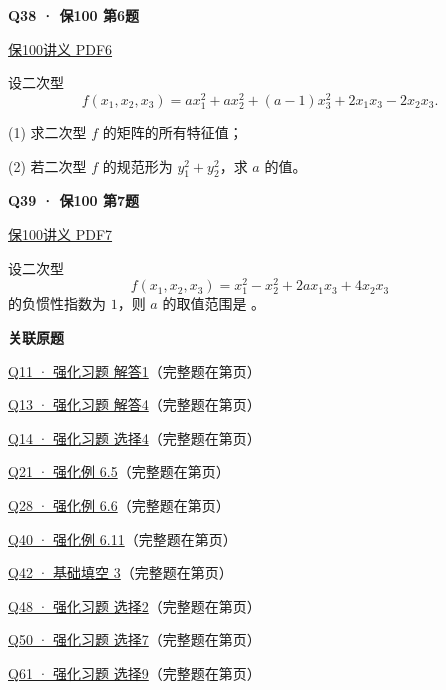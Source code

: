 \documentclass[UTF8,fontset=fandol,11pt,a4paper]{ctexart}
\newcommand{\source}[1]{{\footnotesize\color{Muted}#1\par}}
\newcommand{\qtitle}[2]{\par\needspace{5\baselineskip}\hypertarget{#1}{}\label{#1}\textbf{#2}\par}
\begin{document}
\begin{minipage}{\linewidth}
\qtitle{S-06}{Q38 · 保100 第6题}
\source{\href{file:///Users/skyintelligence/Desktop/\%E5\%BE\%97\%E8\%AF\%BB\%E4\%B8\%AA\%E7\%A0\%94-\%E5\%8C\%97\%E5\%A4\%A7\%E8\%BD\%AF\%E5\%BE\%AE/\%E6\%95\%B0\%E5\%AD\%A6\%20150/02\_\%E4\%B8\%93\%E9\%A1\%B9\%E5\%88\%B7\%E9\%A2\%98\_\%E4\%BF\%9D100/\%E7\%BA\%BF\%E6\%80\%A7\%E4\%BB\%A3\%E6\%95\%B0/\%E7\%BA\%BF\%E6\%80\%A7\%E4\%BB\%A3\%E6\%95\%B0\%E4\%B8\%93\%E9\%A1\%B9\%E5\%88\%B7\%E9\%A2\%98\%E8\%AF\%BE14-\%E4\%BA\%8C\%E6\%AC\%A1\%E5\%9E\%8B\%20\%E8\%AE\%B2\%E4\%B9\%89.pdf\#page=6}{保100讲义 PDF6}}
设二次型\[f(x_1,x_2,x_3)=ax_1^2+ax_2^2+(a-1)x_3^2+2x_1x_3-2x_2x_3.\]\par (1) 求二次型 \(f\) 的矩阵的所有特征值；\par (2) 若二次型 \(f\) 的规范形为 \(y_1^2+y_2^2\)，求 \(a\) 的值。
\end{minipage}\par\vspace{7mm}
\begin{minipage}{\linewidth}
\qtitle{S-07}{Q39 · 保100 第7题}
\source{\href{file:///Users/skyintelligence/Desktop/\%E5\%BE\%97\%E8\%AF\%BB\%E4\%B8\%AA\%E7\%A0\%94-\%E5\%8C\%97\%E5\%A4\%A7\%E8\%BD\%AF\%E5\%BE\%AE/\%E6\%95\%B0\%E5\%AD\%A6\%20150/02\_\%E4\%B8\%93\%E9\%A1\%B9\%E5\%88\%B7\%E9\%A2\%98\_\%E4\%BF\%9D100/\%E7\%BA\%BF\%E6\%80\%A7\%E4\%BB\%A3\%E6\%95\%B0/\%E7\%BA\%BF\%E6\%80\%A7\%E4\%BB\%A3\%E6\%95\%B0\%E4\%B8\%93\%E9\%A1\%B9\%E5\%88\%B7\%E9\%A2\%98\%E8\%AF\%BE14-\%E4\%BA\%8C\%E6\%AC\%A1\%E5\%9E\%8B\%20\%E8\%AE\%B2\%E4\%B9\%89.pdf\#page=7}{保100讲义 PDF7}}
设二次型\[f(x_1,x_2,x_3)=x_1^2-x_2^2+2ax_1x_3+4x_2x_3\]的负惯性指数为 \(1\)，则 \(a\) 的取值范围是 \underline{\hspace{2cm}}。
\end{minipage}\par\vspace{7mm}
\textbf{关联原题}\par
\hyperlink{R-LONG-01}{Q11 · 强化习题 解答1}（完整题在第\pageref*{R-LONG-01}页）\par
\hyperlink{R-LONG-04}{Q13 · 强化习题 解答4}（完整题在第\pageref*{R-LONG-04}页）\par
\hyperlink{R-MC-04}{Q14 · 强化习题 选择4}（完整题在第\pageref*{R-MC-04}页）\par
\hyperlink{R-EX-05}{Q21 · 强化例 6.5}（完整题在第\pageref*{R-EX-05}页）\par
\hyperlink{R-EX-06}{Q28 · 强化例 6.6}（完整题在第\pageref*{R-EX-06}页）\par
\hyperlink{R-EX-11}{Q40 · 强化例 6.11}（完整题在第\pageref*{R-EX-11}页）\par
\hyperlink{B-FB-03}{Q42 · 基础填空 3}（完整题在第\pageref*{B-FB-03}页）\par
\hyperlink{R-MC-02}{Q48 · 强化习题 选择2}（完整题在第\pageref*{R-MC-02}页）\par
\hyperlink{R-MC-07}{Q50 · 强化习题 选择7}（完整题在第\pageref*{R-MC-07}页）\par
\hyperlink{R-MC-09}{Q61 · 强化习题 选择9}（完整题在第\pageref*{R-MC-09}页）\par
\clearpage
\end{document}
